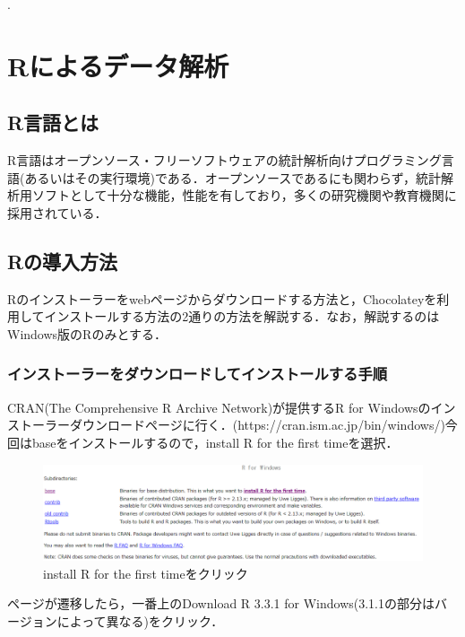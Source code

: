  
 
 
 
 

.



\section{Rによるデータ解析}

\subsection{R言語とは}

R言語はオープンソース・フリーソフトウェアの統計解析向けプログラミング言語(あるいはその実行環境)である．\cite{R}オープンソースであるにも関わらず，統計解析用ソフトとして十分な機能，性能を有しており，多くの研究機関や教育機関に採用されている．
\subsection{Rの導入方法}

Rのインストーラーをwebページからダウンロードする方法と，Chocolateyを利用してインストールする方法の2通りの方法を解説する．なお，解説するのはWindows版のRのみとする．

\subsubsection{インストーラーをダウンロードしてインストールする手順}

CRAN(The Comprehensive R Archive Network)が提供するR for Windowsのインストーラーダウンロードページに行く．(https://cran.ism.ac.jp/bin/windows/)今回はbaseをインストールするので，install R for the first timeを選択．

\begin{figure}[htbp]
\centering 
\includegraphics[width=13cm]{rinst1.png}
\caption{install R for the first timeをクリック}
\end{figure}

\newpage
ページが遷移したら，一番上のDownload R 3.3.1 for Windows(3.1.1の部分はバージョンによって異なる)をクリック．

